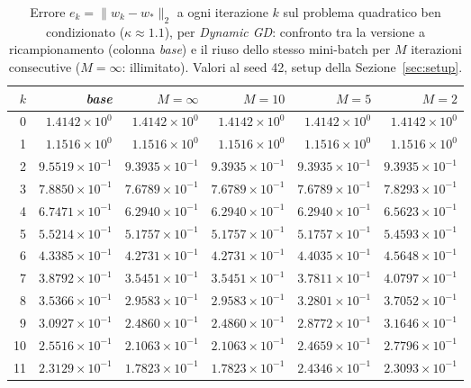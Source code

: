 \begin{table}[H]
\centering
\footnotesize
\renewcommand{\arraystretch}{0.85}
\setlength{\tabcolsep}{4pt}
\caption{Errore $e_k=\|w_k-w_*\|_2$ a ogni iterazione $k$ sul problema quadratico ben condizionato ($\kappa\approx 1.1$), per \emph{Dynamic GD}: confronto tra la versione a ricampionamento (colonna \emph{base}) e il riuso dello stesso mini-batch per $M$ iterazioni consecutive ($M=\infty$: illimitato). Valori al seed 42, setup della Sezione~\ref{sec:setup}.}
\label{tab:riuso_bencond_gd}
\begin{tabular}{@{}rrrrrr@{}}
\toprule
$k$ & \emph{base} & $M{=}\infty$ & $M{=}10$ & $M{=}5$ & $M{=}2$\\
\midrule
0 & $1.4142\times10^{0}$ & $1.4142\times10^{0}$ & $1.4142\times10^{0}$ & $1.4142\times10^{0}$ & $1.4142\times10^{0}$\\
1 & $1.1516\times10^{0}$ & $1.1516\times10^{0}$ & $1.1516\times10^{0}$ & $1.1516\times10^{0}$ & $1.1516\times10^{0}$\\
2 & $9.5519\times10^{-1}$ & $9.3935\times10^{-1}$ & $9.3935\times10^{-1}$ & $9.3935\times10^{-1}$ & $9.3935\times10^{-1}$\\
3 & $7.8850\times10^{-1}$ & $7.6789\times10^{-1}$ & $7.6789\times10^{-1}$ & $7.6789\times10^{-1}$ & $7.8293\times10^{-1}$\\
4 & $6.7471\times10^{-1}$ & $6.2940\times10^{-1}$ & $6.2940\times10^{-1}$ & $6.2940\times10^{-1}$ & $6.5623\times10^{-1}$\\
5 & $5.5214\times10^{-1}$ & $5.1757\times10^{-1}$ & $5.1757\times10^{-1}$ & $5.1757\times10^{-1}$ & $5.4593\times10^{-1}$\\
6 & $4.3385\times10^{-1}$ & $4.2731\times10^{-1}$ & $4.2731\times10^{-1}$ & $4.4035\times10^{-1}$ & $4.5648\times10^{-1}$\\
7 & $3.8792\times10^{-1}$ & $3.5451\times10^{-1}$ & $3.5451\times10^{-1}$ & $3.7811\times10^{-1}$ & $4.0797\times10^{-1}$\\
8 & $3.5366\times10^{-1}$ & $2.9583\times10^{-1}$ & $2.9583\times10^{-1}$ & $3.2801\times10^{-1}$ & $3.7052\times10^{-1}$\\
9 & $3.0927\times10^{-1}$ & $2.4860\times10^{-1}$ & $2.4860\times10^{-1}$ & $2.8772\times10^{-1}$ & $3.1646\times10^{-1}$\\
10 & $2.5516\times10^{-1}$ & $2.1063\times10^{-1}$ & $2.1063\times10^{-1}$ & $2.4659\times10^{-1}$ & $2.7796\times10^{-1}$\\
11 & $2.3129\times10^{-1}$ & $1.7823\times10^{-1}$ & $1.7823\times10^{-1}$ & $2.4346\times10^{-1}$ & $2.3093\times10^{-1}$\\

\end{tabular}
\end{table}
